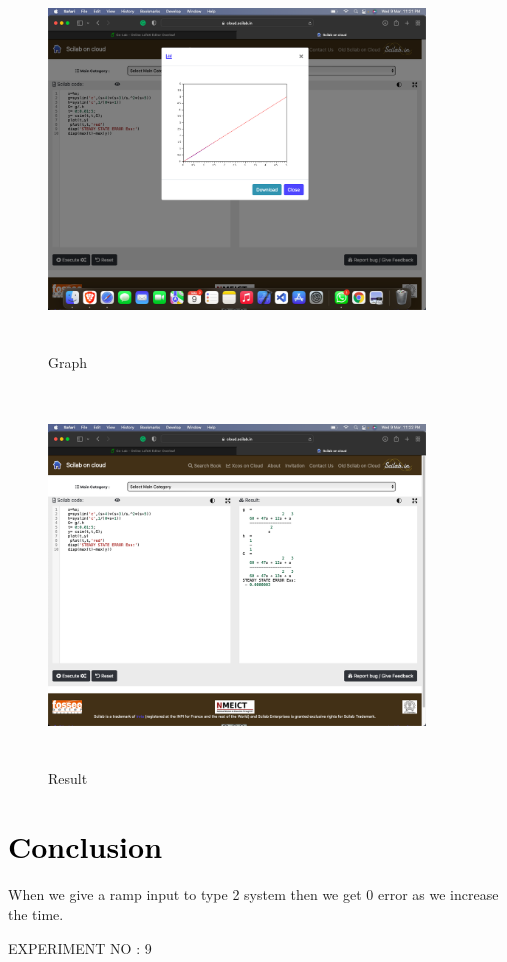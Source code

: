 \documentclass[12pt]{article}
\begin{document}
\begin{figure}[!hth]
        \centering
        \includegraphics[width =10cm, height = 10cm]{images/exp81.png}
        \caption{Graph}
        \label{Graph}
\end{figure}
\begin{figure}[!hth]
        \centering
        \includegraphics[width =10cm, height = 10cm]{images/exp82.png}
        \caption{Result}
        \label{Result}
\end{figure}

\section*{\textcolor{black}{Conclusion}}
 When we give a ramp input to type 2 system then we get 0 error as we increase the time.
     \pagebreak
\maketitle
\begin{center}
    \LARGE {EXPERIMENT NO : 9}
             
\end{center}
\end{document}
